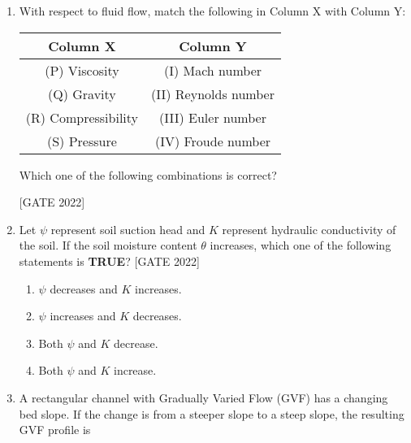 \documentclass[journal,12pt,onecolumn]{IEEEtran}
\theoremstyle{remark}
\begin{document}
\begin{enumerate}
\item With respect to fluid flow, match the following in Column X with Column Y:

\begin{center}
\begin{tabular}{|c|c|}
\hline
\textbf{Column X} & \textbf{Column Y} \\
\hline
(P) Viscosity & (I) Mach number \\
(Q) Gravity & (II) Reynolds number \\
(R) Compressibility & (III) Euler number \\
(S) Pressure & (IV) Froude number \\
\hline
\end{tabular}
\end{center}

Which one of the following combinations is correct?

\hfill{[GATE 2022]}\begin{enumerate}
\end{enumerate}

\item Let  $ \psi  $ represent soil suction head and  $ K  $ represent hydraulic conductivity of the soil. If the soil moisture content  $ \theta  $ increases, which one of the following statements is \textbf{TRUE}?
\hfill{[GATE 2022]}
\begin{multicols}{2}
\begin{enumerate}
    \item  $ \psi  $ decreases and  $ K  $ increases.
    \item  $ \psi  $ increases and  $ K  $ decreases.
    \item Both  $ \psi  $ and  $ K  $ decrease.
    \item Both  $ \psi  $ and  $ K  $ increase.
\end{enumerate}
\end{multicols}

\item A rectangular channel with Gradually Varied Flow (GVF) has a changing bed slope. If the change is from a steeper slope to a steep slope, the resulting GVF profile is


\end{enumerate}
\end{document}

